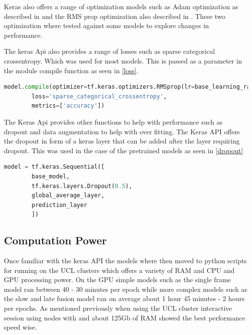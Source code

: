 \documentclass[10pt,phd,a4paper,oneside]{article}
\begin{document}

    Keras also offers a range of optimization models such as Adam optimization as described in \citep{kingma2014adam} \citep{ruder2016overview} and the RMS prop optimization also described in \citep{ruder2016overview}. These two optimization where tested against some models to explore changes in performance.

    The keras Api also provides a range of losses such as sparse categorical crossentropy. Which was used for most models. This is passed as a parameter in the module compile function as seen in \ref{loss}.

    \begin{lstlisting}[language=Python, caption=Compiling model with  sparse categorical crossentropy loss , label=loss]
        model.compile(optimizer=tf.keras.optimizers.RMSprop(lr=base_learning_rate),
        loss='sparse_categorical_crossentropy',
        metrics=['accuracy'])
    \end{lstlisting}


    The Keras Api provides other functions to help with performance such as dropout and data augmentation to help with over fitting. The Keras API offers the dropout in form of a keras layer that can be added after the layer requiring dropout. This was used in the case of the pretrained models as seen in \ref{dropout}

    \begin{lstlisting}[language=Python, caption=Application of dropout to pretrained models, label=dropout]
        model = tf.keras.Sequential([
        base_model,
        tf.keras.layers.Dropout(0.5),
        global_average_layer,
        prediction_layer
        ])
    \end{lstlisting}


    \subsection{Computation Power}
    Once familiar with the keras API the models where then moved to python scripts for running on the UCL clusters which offers a variety of RAM and CPU and GPU processing power. On the GPU simple models such as the single frame model ran between 40 - 30 minutes per epoch while more complex models such as the slow and late fusion model ran on average about 1 hour 45 minutes - 2 hours per epochs. As mentioned previously when using the UCL cluster interactive session using nodes with  and about 125Gb of RAM showed the best performance speed wise.
\end{document}
